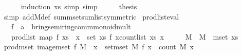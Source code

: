 \begin{isabellebody}
\ \ \ \ \isamarkupfalse%
\ {\isacharparenleft}{\kern0pt}induction\ xs{\isacharcomma}{\kern0pt}\ simp{\isacharcomma}{\kern0pt}\ simp{\isacharparenright}{\kern0pt}\isanewline
\ \ \isamarkupfalse%
\ \isamarkupfalse%
\ {\isacharquery}{\kern0pt}thesis\isanewline
\ \ \ \ \isamarkupfalse%
\ {\isacharparenleft}{\kern0pt}simp\ add{\isacharcolon}{\kern0pt}M{\isacharunderscore}{\kern0pt}def\ sum{\isacharunderscore}{\kern0pt}mset{\isacharunderscore}{\kern0pt}sum{\isacharunderscore}{\kern0pt}list{\isacharbrackleft}{\kern0pt}symmetric{\isacharbrackright}{\kern0pt}{\isacharparenright}{\kern0pt}\isanewline
{}\isamarkupfalse%
%
\endisatagproof
{\isafoldproof}%
%
\isadelimproof
\isanewline
%
\endisadelimproof
\isanewline
{}\isamarkupfalse%
\ prod{\isacharunderscore}{\kern0pt}list{\isacharunderscore}{\kern0pt}eval{\isacharcolon}{\kern0pt}\isanewline
\ \ \ f\ {\isacharcolon}{\kern0pt}{\isacharcolon}{\kern0pt}\ {\isachardoublequoteopen}{\isacharprime}{\kern0pt}a\ {\isasymRightarrow}\ {\isacharprime}{\kern0pt}b{\isacharcolon}{\kern0pt}{\isacharcolon}{\kern0pt}{\isacharbraceleft}{\kern0pt}ring{\isacharcomma}{\kern0pt}semiring{\isacharunderscore}{\kern0pt}{}{\isacharcomma}{\kern0pt}comm{\isacharunderscore}{\kern0pt}monoid{\isacharunderscore}{\kern0pt}mult{\isacharbraceright}{\kern0pt}{\isachardoublequoteclose}\isanewline
\ \ \ {\isachardoublequoteopen}prod{\isacharunderscore}{\kern0pt}list\ {\isacharparenleft}{\kern0pt}map\ f\ xs{\isacharparenright}{\kern0pt}\ {\isacharequal}{\kern0pt}\ {\isacharparenleft}{\kern0pt}{\isasymProd}x\ {\isasymin}\ set\ xs{\isachardot}{\kern0pt}\ {\isacharparenleft}{\kern0pt}f\ x{\isacharparenright}{\kern0pt}{\isacharcircum}{\kern0pt}{\isacharparenleft}{\kern0pt}count{\isacharunderscore}{\kern0pt}list\ xs\ x{\isacharparenright}{\kern0pt}{\isacharparenright}{\kern0pt}{\isachardoublequoteclose}\isanewline
%
\isadelimproof
%
\endisadelimproof
%
\isatagproof
{}\isamarkupfalse%
\ {\isacharminus}{\kern0pt}\isanewline
\ \ \isamarkupfalse%
\ M\ \ {\isachardoublequoteopen}M\ {\isacharequal}{\kern0pt}\ mset\ xs{\isachardoublequoteclose}\isanewline
\ \ \isamarkupfalse%
\ {\isachardoublequoteopen}prod{\isacharunderscore}{\kern0pt}mset\ {\isacharparenleft}{\kern0pt}image{\isacharunderscore}{\kern0pt}mset\ f\ M{\isacharparenright}{\kern0pt}\ {\isacharequal}{\kern0pt}\ {\isacharparenleft}{\kern0pt}{\isasymProd}x\ {\isasymin}\ set{\isacharunderscore}{\kern0pt}mset\ M{\isachardot}{\kern0pt}\ f\ x\ {\isacharcircum}{\kern0pt}\ {\isacharparenleft}{\kern0pt}count\ M\ x{\isacharparenright}{\kern0pt}{\isacharparenright}{\kern0pt}{\isachardoublequoteclose}\isanewline

\end{isabellebody}

